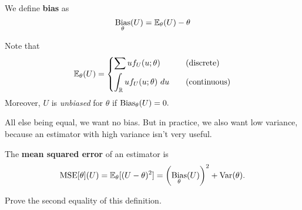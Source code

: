 \begin{definition}
We define \textbf{bias} as
$$\operatorname*{Bias}_\theta(U)=\mathbb E_\theta(U)-\theta$$
\end{definition}
Note that
$$
\mathbb E_\theta(U)=\begin{dcases}
		\sum uf_U(u;\theta) \quad &\text{(discrete)}\\
\int_{\mathbb R} u f_U(u;\theta) \ du \quad &\text{(continuous)}
\end{dcases}
$$
Moreover, $U$ is \textit{unbiased} for $\theta$ if $\operatorname*{Bias}_\theta(U)=0.$ 

All else being equal, we want no bias. But in practice, we also want low variance, because an estimator with high variance isn't very useful. 

\begin{definition}
The \textbf{mean squared error} of an estimator is $$\operatorname*{MSE}[\theta](U)=\mathbb E_\theta[(U-\theta)^2]=\left(\operatorname*{Bias}_\theta(U)\right)^2+\operatorname*{Var}(\theta).$$
\end{definition}

\begin{ex}
		Prove the second equality of this definition.
\end{ex}
